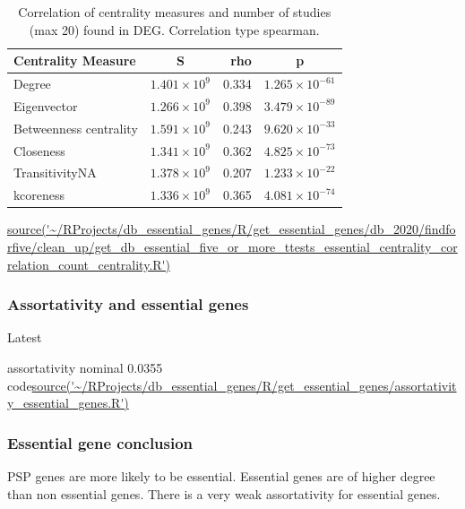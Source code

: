 \begin{table}[ht]
\centering
\begin{tabular}{lcrc}
  \toprule
Centrality Measure & S & rho & p \\ 
  \midrule
 Degree  & $1.401 \times 10^{9}$ & 0.334 & $1.265 \times 10^{-61}$ \\ 
 Eigenvector   & $1.266 \times 10^{9}$ & 0.398 & $3.479 \times 10^{-89}$ \\ 
 Betweenness centrality   & $1.591 \times 10^{9}$ & 0.243 & $9.620 \times 10^{-33}$ \\ 
   Closeness   & $1.341 \times 10^{9}$ & 0.362 & $4.825 \times 10^{-73}$ \\ 
  TransitivityNA   & $1.378 \times 10^{9}$ & 0.207 & $1.233 \times 10^{-22}$ \\ 
  kcoreness   & $1.336 \times 10^{9}$ & 0.365 & $4.081 \times 10^{-74}$ \\ 
   \bottomrule
\end{tabular}
\caption{Correlation of centrality measures and number of studies (max 20) found in DEG. Correlation type spearman.}
\tiny\url{source('~/RProjects/db_essential_genes/R/get_essential_genes/db_2020/findforfive/clean_up/get_db_essential_five_or_more_ttests_essential_centrality_correlation_count_centrality.R')}
\label{tab:Correlation centrality and num studies DEG}
\end{table}
\subsubsection{Assortativity and essential genes}
\label{sec:Assortativity and essential genes}
Latest 

assortativity nominal 0.0355
code\url{source('~/RProjects/db_essential_genes/R/get_essential_genes/assortativity_essential_genes.R')}

\subsubsection{Essential gene conclusion}
PSP genes are more likely to be essential. Essential genes are of higher degree than non essential genes. There is a very weak assortativity for essential genes. 




